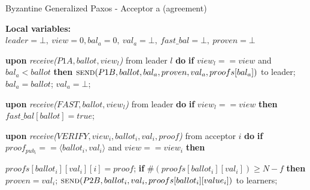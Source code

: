\begin{algorithm} 
	\caption{Byzantine Generalized Paxos - Acceptor a (agreement)}
	\label{BFT-Acc}
	\textbf{Local variables:} $leader = \bot,\ view = 0, bal_a = 0,\ val_a = \bot,\ fast\_bal = \bot,\ proven = \bot$
	\begin{algorithmic}[1]
		\State \textbf{upon} \textit{receive($P1A, ballot, view_l$)} from leader $l$ \textbf{do}
		\State \hspace{\algorithmicindent} \textbf{if} $view_l == view$ and $bal_a < ballot$ \textbf{then}
		\State \hspace{\algorithmicindent}\hspace{\algorithmicindent} $\Call{send}{P1B, ballot,bal_a,proven, val_a, proofs[bal_a]}$ to leader;
		\State \hspace{\algorithmicindent}\hspace{\algorithmicindent} $bal_a = ballot$;	
		\State \hspace{\algorithmicindent}\hspace{\algorithmicindent} $val_a = \bot$;	
		
		
		\State
		\State \textbf{upon} \textit{receive($FAST,ballot,view_l$)} from leader \textbf{do}
		\State \hspace{\algorithmicindent} \textbf{if} $view_l == view$ \textbf{then}
		\State \hspace{\algorithmicindent}\hspace{\algorithmicindent} $fast\_bal[ballot] = true$;

		\State
		\State \textbf{upon} \textit{receive($VERIFY,view_i, ballot_i,val_i,proof$)} from acceptor $i$ \textbf{do}
		\State \hspace{\algorithmicindent} \textbf{if} $proof_{pub_i} == \langle ballot_i, val_i \rangle$ and $view == view_i$ \textbf{then}
		
		\State \hspace{\algorithmicindent}\hspace{\algorithmicindent} $proofs[ballot_i][val_i][i] = proof$;
		\State \hspace{\algorithmicindent}\hspace{\algorithmicindent} \textbf{if} $\#(proofs[ballot_i][val_i]) \geq N-f$ \textbf{then}
		\State \hspace{\algorithmicindent}\hspace{\algorithmicindent}\hspace{\algorithmicindent} $proven = val_i$;
		\State \hspace{\algorithmicindent}\hspace{\algorithmicindent}\hspace{\algorithmicindent} $\Call{send}{P2B, ballot_i, val_i, proofs[ballot_i][value_i]}$ to learners;
		

\end{algorithmic}
\end{algorithm}
